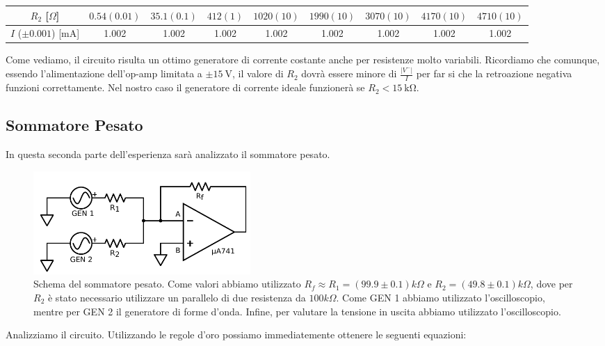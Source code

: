 \begin{center}
\begin{tabular}{c|c|c|c|c|c|c|c|c}
$R_2$ [$\Omega$] & $0.54(0.01)$ & $35.1(0.1)$ & $412(1)$ & $1020(10)$ & $1990(10)$ & $3070(10)$ & $4170(10)$ & $4710(10)$ \\ 
\hline 
$I$ ($\pm 0.001$) [$\si{\milli\ampere}$] & 1.002 & 1.002 & 1.002 & 1.002 & 1.002 & 1.002 & 1.002 & 1.002 \\ 
\end{tabular}
\end{center}

Come vediamo, il circuito risulta un ottimo generatore di corrente costante anche per resistenze molto variabili. Ricordiamo che comunque, essendo l'alimentazione dell'op-amp limitata a $\pm \SI{15}{\volt}$, il valore di $R_2$ dovrà essere minore di $\frac{|V^-|}{I}$ per far si che la retroazione negativa funzioni correttamente. Nel nostro caso il generatore di corrente ideale funzionerà se $R_2< \SI{15}{\kilo\ohm}$.




\subsection{Sommatore Pesato}

In questa seconda parte dell'esperienza sarà analizzato il sommatore pesato. 

\begin{figure}
  \begin{center}
    \includegraphics[width=0.40\textwidth]{../E01/latex/c2.pdf}
  \end{center}
  \caption{Schema del sommatore pesato. Come valori abbiamo utilizzato $R_f \approx R_1=(99.9 \pm 0.1) k \Omega$ e $R_2=(49.8 \pm 0.1) k \Omega$, dove per $R_2$ è stato necessario utilizzare un parallelo di due resistenza da $100 k\Omega$. Come GEN 1 abbiamo utilizzato l'oscilloscopio, mentre per GEN 2 il generatore di forme d'onda. Infine, per valutare la tensione in uscita abbiamo utilizzato l'oscilloscopio.}
\end{figure}

Analizziamo il circuito. Utilizzando le regole d'oro possiamo immediatemente ottenere le seguenti equazioni:

